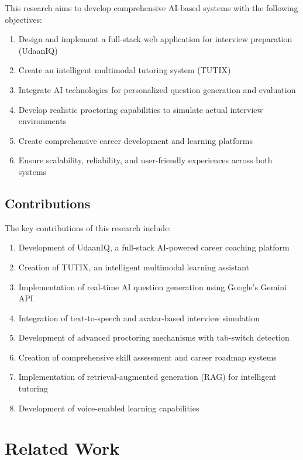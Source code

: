 \documentclass[12pt, conference]{IEEEtran}
\begin{document}
This research aims to develop comprehensive AI-based systems with the following objectives:
\begin{enumerate}
    \item Design and implement a full-stack web application for interview preparation (UdaanIQ)
    \item Create an intelligent multimodal tutoring system (TUTIX)
    \item Integrate AI technologies for personalized question generation and evaluation
    \item Develop realistic proctoring capabilities to simulate actual interview environments
    \item Create comprehensive career development and learning platforms
    \item Ensure scalability, reliability, and user-friendly experiences across both systems
\end{enumerate}

\subsection{Contributions}

The key contributions of this research include:
\begin{enumerate}
    \item Development of UdaanIQ, a full-stack AI-powered career coaching platform
    \item Creation of TUTIX, an intelligent multimodal learning assistant
    \item Implementation of real-time AI question generation using Google's Gemini API
    \item Integration of text-to-speech and avatar-based interview simulation
    \item Development of advanced proctoring mechanisms with tab-switch detection
    \item Creation of comprehensive skill assessment and career roadmap systems
    \item Implementation of retrieval-augmented generation (RAG) for intelligent tutoring
    \item Development of voice-enabled learning capabilities
\end{enumerate}

\section{Related Work}
\end{document}
